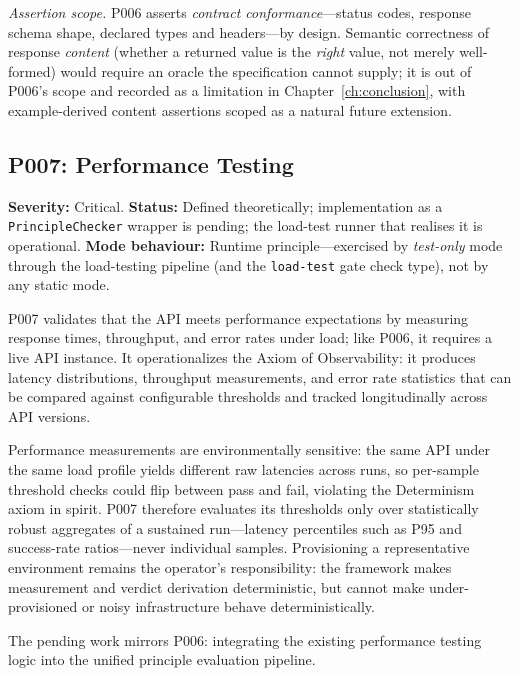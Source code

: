 \textit{Assertion scope.} P006 asserts \emph{contract conformance}---status codes, response schema shape, declared types and headers---by design. Semantic correctness of response \emph{content} (whether a returned value is the \emph{right} value, not merely well-formed) would require an oracle the specification cannot supply; it is out of P006's scope and recorded as a limitation in Chapter~\ref{ch:conclusion}, with example-derived content assertions scoped as a natural future extension.

\subsection{P007: Performance Testing}
\label{subsec:p007}

\textbf{Severity:} Critical. \textbf{Status:} Defined theoretically; implementation as a \texttt{PrincipleChecker} wrapper is pending; the load-test runner that realises it is operational. \textbf{Mode behaviour:} Runtime principle---exercised by \textit{test-only} mode through the load-testing pipeline (and the \texttt{load-test} gate check type), not by any static mode.

P007 validates that the API meets performance expectations by measuring response times, throughput, and error rates under load; like P006, it requires a live API instance. It operationalizes the Axiom of Observability: it produces latency distributions, throughput measurements, and error rate statistics that can be compared against configurable thresholds and tracked longitudinally across API versions.

Performance measurements are environmentally sensitive: the same API under the same load profile yields different raw latencies across runs, so per-sample threshold checks could flip between pass and fail, violating the Determinism axiom in spirit. P007 therefore evaluates its thresholds only over statistically robust aggregates of a sustained run---latency percentiles such as P95 and success-rate ratios---never individual samples. Provisioning a representative environment remains the operator's responsibility: the framework makes measurement and verdict derivation deterministic, but cannot make under-provisioned or noisy infrastructure behave deterministically.

The pending work mirrors P006: integrating the existing performance testing logic into the unified principle evaluation pipeline.

